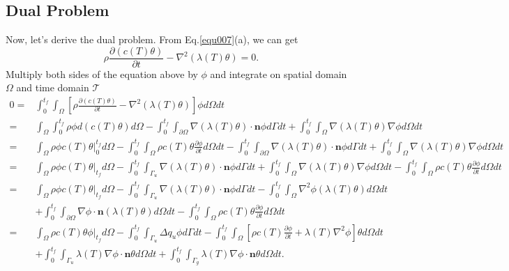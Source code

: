 \documentclass[UTF-8]{article}
\begin{document}
\subsection{Dual Problem}
Now, let's derive the dual problem. From Eq.\ref{equ007}(a), we can get
\begin{equation*}
	\rho \frac{\partial \left( c(T) \theta \right)}{\partial t} - \nabla^2 \left( \lambda(T) \theta \right) = 0.
\end{equation*}
Multiply both sides of the equation above by $\phi$ and integrate on spatial domain $\Omega$ and time domain $\mathcal{T}$
\begin{align}\label{equ020}
	0 =& \int_{0}^{t_f} \int_\Omega \left[ \rho \frac{\partial \left(c(T)\theta\right)}{\partial t} - \nabla^2\left( \lambda(T) \theta \right) \right] \phi d\Omega dt \nonumber \\
	=& \int_\Omega \int_{0}^{t_f} \rho \phi d\left( c(T)\theta \right) d\Omega - \int_{0}^{t_f} \int_{\partial \Omega} \nabla\left( \lambda(T)\theta \right) \cdot \pmb{n} \phi d\Gamma dt + \int_{0}^{t_f} \int_\Omega \nabla\left( \lambda(T)\theta \right) \nabla\phi d\Omega dt \nonumber \\
	=& \int_\Omega  \rho \phi c(T)\theta \big|_0^{t_f} d\Omega - \int_{0}^{t_f} \int_\Omega \rho c(T) \theta \frac{\partial \phi}{\partial t} d\Omega dt - \int_{0}^{t_f} \int_{\partial \Omega} \nabla\left( \lambda(T)\theta \right) \cdot \pmb{n} \phi d\Gamma dt + \int_{0}^{t_f} \int_\Omega \nabla\left( \lambda(T)\theta \right) \nabla\phi d\Omega dt \nonumber \\
	=& \int_\Omega  \rho \phi c(T)\theta \big|_{t_f} d\Omega - \int_{0}^{t_f} \int_{\Gamma_u} \nabla\left( \lambda(T)\theta \right) \cdot \pmb{n} \phi d\Gamma dt + \int_{0}^{t_f} \int_\Omega \nabla\left( \lambda(T)\theta \right) \nabla\phi d\Omega dt - \int_{0}^{t_f} \int_\Omega \rho c(T) \theta \frac{\partial \phi}{\partial t} d\Omega dt \nonumber \\
	=& \int_\Omega  \rho \phi c(T)\theta \big|_{t_f} d\Omega - \int_{0}^{t_f} \int_{\Gamma_u} \nabla\left( \lambda(T)\theta \right) \cdot \pmb{n} \phi d\Gamma dt - \int_{0}^{t_f} \int_\Omega \nabla^2 \phi \left( \lambda(T)\theta \right) d\Omega dt \nonumber \\
	&+ \int_{0}^{t_f} \int_{\partial \Omega} \nabla\phi\cdot \pmb{n} \left( \lambda(T)\theta \right) d\Omega dt - \int_{0}^{t_f} \int_\Omega \rho c(T) \theta \frac{\partial \phi}{\partial t} d\Omega dt \nonumber \\
	=& \int_\Omega  \rho c(T)\theta \phi \big|_{t_f} d\Omega - \int_{0}^{t_f} \int_{\Gamma_u} \Delta q_u \phi d\Gamma dt - \int_{0}^{t_f} \int_\Omega \left[ \rho c(T) \frac{\partial \phi}{\partial t} + \lambda(T) \nabla^2 \phi \right] \theta d\Omega dt \nonumber \\
	&+ \int_{0}^{t_f} \int_{\Gamma_u} \lambda(T) \nabla\phi\cdot \pmb{n} \theta  d\Omega dt + \int_{0}^{t_f} \int_{\Gamma_g} \lambda(T) \nabla\phi\cdot \pmb{n} \theta d\Omega dt.
\end{align}
\end{document}
